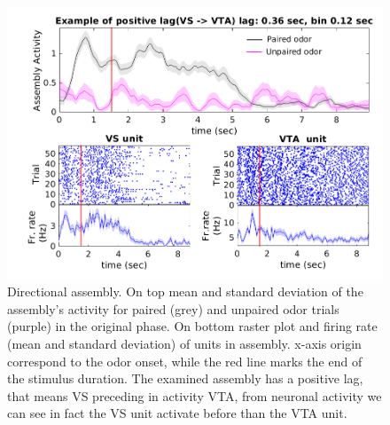 \begin{figure}
    \centering
    \includegraphics[scale=0.4]{figures/1_21Lastrev1Pru_An4Poster2.png}
    \caption{Directional assembly. On top mean and standard deviation of the assembly's activity for paired (grey) and unpaired odor trials (purple) in the original phase. On bottom raster plot and firing rate (mean and standard deviation) of units in assembly. x-axis origin correspond to the odor onset, while the red line marks the end of the stimulus duration. The examined assembly has a positive lag, that means VS preceding in activity VTA, from neuronal activity we can see in fact the VS unit activate before than the VTA unit.}
    \label{fig:directional_assembly}
\end{figure}


